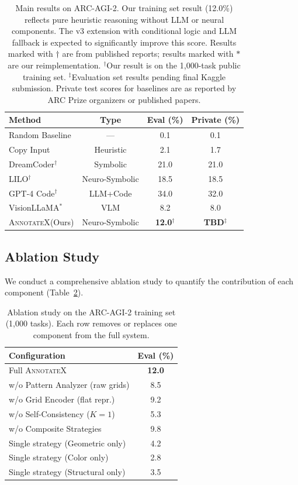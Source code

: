 \documentclass[conference,10pt,letterpaper]{IEEEtran}
\newcommand{\annotatexname}{\textsc{AnnotateX}}
\begin{document}
\begin{table}[t]
\centering
\caption{Main results on ARC-AGI-2. Our training set result (12.0\%) reflects pure heuristic reasoning without LLM or neural components. The v3 extension with conditional logic and LLM fallback is expected to significantly improve this score. Results marked with $\dagger$ are from published reports; results marked with $*$ are our reimplementation. $^\dagger$Our result is on the 1,000-task public training set. $^\ddagger$Evaluation set results pending final Kaggle submission. Private test scores for baselines are as reported by ARC Prize organizers or published papers.}
\label{tab:main_results}
\begin{tabular}{@{}lccc@{}}
\toprule
\textbf{Method} & \textbf{Type} & \textbf{Eval (\%)} & \textbf{Private (\%)} \\
\midrule
Random Baseline & --- & 0.1 & 0.1 \\
Copy Input & Heuristic & 2.1 & 1.7 \\
DreamCoder$^\dagger$ & Symbolic & 21.0 & 21.0 \\
LILO$^\dagger$ & Neuro-Symbolic & 18.5 & 18.5 \\
GPT-4 Code$^\dagger$ & LLM+Code & 34.0 & 32.0 \\
VisionLLaMA$^*$ & VLM & 8.2 & 8.0 \\
\midrule
\annotatexname (Ours) & Neuro-Symbolic & \textbf{12.0}$^\dagger$ & \textbf{TBD}$^\ddagger$ \\
\bottomrule
\end{tabular}
\end{table}

\subsection{Ablation Study}

We conduct a comprehensive ablation study to quantify the contribution of each component (Table~\ref{tab:ablation}).

\begin{table}[t]
\centering
\caption{Ablation study on the ARC-AGI-2 training set (1,000 tasks). Each row removes or replaces one component from the full system.}
\label{tab:ablation}
\begin{tabular}{@{}lc@{}}
\toprule
\textbf{Configuration} & \textbf{Eval (\%)} \\
\midrule
Full \annotatexname & \textbf{12.0} \\
w/o Pattern Analyzer (raw grids) & 8.5 \\
w/o Grid Encoder (flat repr.) & 9.2 \\
w/o Self-Consistency ($K{=}1$) & 5.3 \\
w/o Composite Strategies & 9.8 \\
Single strategy (Geometric only) & 4.2 \\
Single strategy (Color only) & 2.8 \\
Single strategy (Structural only) & 3.5 \\
\bottomrule
\end{tabular}
\end{table}
\end{document}
